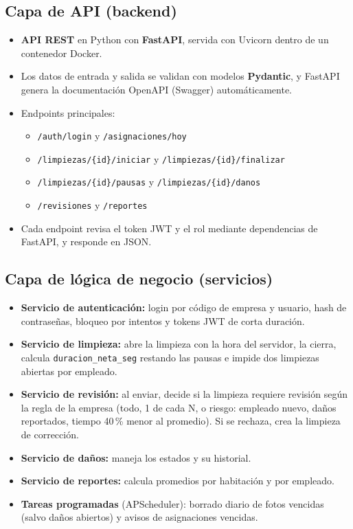 \documentclass[11pt,a4paper]{article}
\begin{document}
\subsection{Capa de API (backend)}
\begin{itemize}[leftmargin=1.2em]
  \item \textbf{API REST} en Python con \textbf{FastAPI}, servida con Uvicorn dentro de un contenedor Docker.
  \item Los datos de entrada y salida se validan con modelos \textbf{Pydantic}, y FastAPI genera la documentación OpenAPI (Swagger) automáticamente.
  \item Endpoints principales:
  \begin{itemize}[leftmargin=1.2em]
    \item \texttt{/auth/login} y \texttt{/asignaciones/hoy}
    \item \texttt{/limpiezas/\{id\}/iniciar} y \texttt{/limpiezas/\{id\}/finalizar}
    \item \texttt{/limpiezas/\{id\}/pausas} y \texttt{/limpiezas/\{id\}/danos}
    \item \texttt{/revisiones} y \texttt{/reportes}
  \end{itemize}
  \item Cada endpoint revisa el token JWT y el rol mediante dependencias de FastAPI, y responde en JSON.
\end{itemize}

\subsection{Capa de lógica de negocio (servicios)}
\begin{itemize}[leftmargin=1.2em]
  \item \textbf{Servicio de autenticación:} login por código de empresa y usuario, hash de contraseñas, bloqueo por intentos y tokens JWT de corta duración.
  \item \textbf{Servicio de limpieza:} abre la limpieza con la hora del servidor, la cierra, calcula \texttt{duracion\_neta\_seg} restando las pausas e impide dos limpiezas abiertas por empleado.
  \item \textbf{Servicio de revisión:} al enviar, decide si la limpieza requiere revisión según la regla de la empresa (todo, 1 de cada N, o riesgo: empleado nuevo, daños reportados, tiempo 40\,\% menor al promedio). Si se rechaza, crea la limpieza de corrección.
  \item \textbf{Servicio de daños:} maneja los estados y su historial.
  \item \textbf{Servicio de reportes:} calcula promedios por habitación y por empleado.
  \item \textbf{Tareas programadas} (APScheduler): borrado diario de fotos vencidas (salvo daños abiertos) y avisos de asignaciones vencidas.
\end{itemize}
\end{document}

